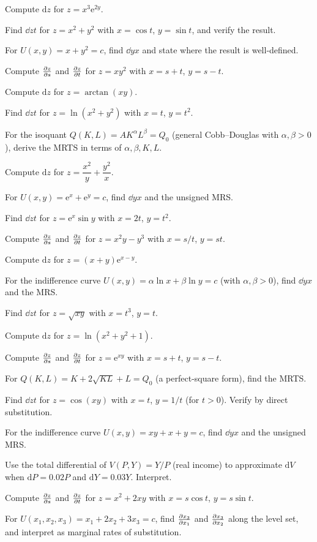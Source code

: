 \begin{problems}
  \item Compute $\mathrm{d}z$ for $z=x^{3}\mathrm{e}^{2y}$.
  \item Find $\dd{z}{t}$ for $z=x^{2}+y^{2}$ with $x=\cos t$, $y=\sin t$,
        and verify the result.
  \item For $U(x,y)=x+y^{2}=c$, find $\dd{y}{x}$ and state where the
        result is well-defined.
  \item Compute $\frac{\partial z}{\partial s}$ and $\frac{\partial z}{\partial t}$ for $z=xy^{2}$ with $x=s+t$,
        $y=s-t$.
  \item Compute $\mathrm{d}z$ for $z=\arctan(xy)$.
  \item Find $\dd{z}{t}$ for $z=\ln(x^{2}+y^{2})$ with $x=t$, $y=t^{2}$.
  \item For the isoquant $Q(K,L)=AK^{\alpha}L^{\beta}=Q_{0}$ (general
        Cobb--Douglas with $\alpha,\beta>0$), derive the MRTS in terms of
        $\alpha,\beta,K,L$.
  \item Compute $\mathrm{d}z$ for $z=\dfrac{x^{2}}{y}+\dfrac{y^{2}}{x}$.
  \item For $U(x,y)=\mathrm{e}^{x}+\mathrm{e}^{y}=c$, find $\dd{y}{x}$ and
        the unsigned MRS.
  \item Find $\dd{z}{t}$ for $z=\mathrm{e}^{x}\sin y$ with $x=2t$,
        $y=t^{2}$.
  \item Compute $\frac{\partial z}{\partial s}$ and $\frac{\partial z}{\partial t}$ for $z=x^{2}y-y^{3}$ with
        $x=s/t$, $y=st$.
  \item Compute $\mathrm{d}z$ for $z=(x+y)\mathrm{e}^{x-y}$.
  \item For the indifference curve $U(x,y)=\alpha\ln x+\beta\ln y=c$ (with
        $\alpha,\beta>0$), find $\dd{y}{x}$ and the MRS.
  \item Find $\dd{z}{t}$ for $z=\sqrt{xy}$ with $x=t^{3}$, $y=t$.
  \item Compute $\mathrm{d}z$ for $z=\ln(x^{2}+y^{2}+1)$.
  \item Compute $\frac{\partial z}{\partial s}$ and $\frac{\partial z}{\partial t}$ for $z=\mathrm{e}^{xy}$ with
        $x=s+t$, $y=s-t$.
  \item For $Q(K,L)=K+2\sqrt{KL}+L=Q_{0}$ (a perfect-square form), find
        the MRTS.
  \item Find $\dd{z}{t}$ for $z=\cos(xy)$ with $x=t$, $y=1/t$ (for $t>0$).
        Verify by direct substitution.
  \item For the indifference curve $U(x,y)=xy+x+y=c$, find $\dd{y}{x}$
        and the unsigned MRS.
  \item Use the total differential of $V(P,Y)=Y/P$ (real income) to
        approximate $\mathrm{d}V$ when $\mathrm{d}P=0.02P$ and
        $\mathrm{d}Y=0.03Y$. Interpret.
  \item Compute $\frac{\partial z}{\partial s}$ and $\frac{\partial z}{\partial t}$ for $z=x^{2}+2xy$ with
        $x=s\cos t$, $y=s\sin t$.
  \item For $U(x_{1},x_{2},x_{3})=x_{1}+2x_{2}+3x_{3}=c$, find
        $\frac{\partial x_{3}}{\partial x_{1}}$ and $\frac{\partial x_{3}}{\partial x_{2}}$ along the level set,
        and interpret as marginal rates of substitution.
\end{problems}

